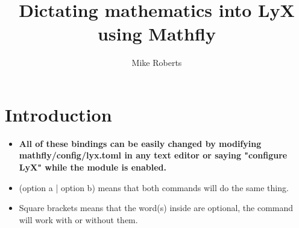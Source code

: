 \documentclass[12pt]{article}
\title{Dictating mathematics into LyX using Mathfly}
\author{Mike Roberts}
\begin{document}
\maketitle
\tableofcontents

\section{Introduction}
\begin{itemize}
\item \textbf{All of these bindings can be easily changed by modifying mathfly/config/lyx.toml in any text editor or saying "configure LyX" while the module is enabled.}
\item (option a | option b) means that both commands will do the same thing.
\item Square brackets means that the word(s) inside are optional, the command will work with or without them.
\end{itemize}
\end{document}
